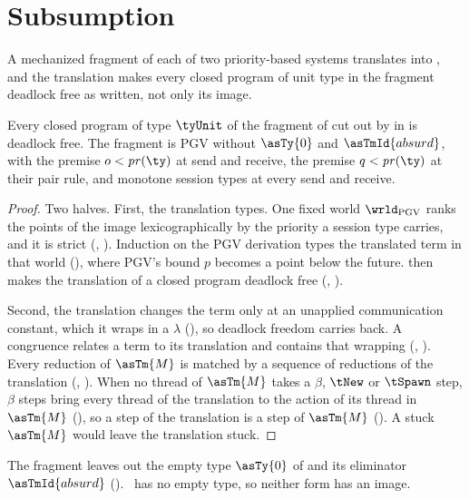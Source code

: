 \section{Subsumption}
\label{sec:ex-priority}

A mechanized fragment of each of two priority-based systems translates
into \OurLang, and the translation makes every closed program of unit
type in the fragment deadlock free as written, not only its image.

\begin{theorem}
\label{thm:pgv}
  Every closed program of type $\tyUnit$ of the fragment of
  \citet{KokkeD23} cut out by  in  is deadlock free. The
  fragment is PGV without $\asTy{0}$ and $\asTmId{absurd}$, with the
  premise $o < \mathit{pr}(\ty)$ at send and receive, the premise
  $q < \mathit{pr}(\ty)$ at their pair rule, and monotone session types
  at every send and receive.
\end{theorem}

\begin{proof}
  Two halves. First, the translation types. One fixed world $\wrld_{\mathrm{PGV}}$
  ranks the points of the image lexicographically by the priority a
  session type carries, and it is strict (,
  ). Induction on the PGV derivation types the
  translated term in that world (), where PGV's
  bound $p$ becomes a point below the future.  then makes the
  translation of a closed program deadlock free
  (, ).

  Second, the translation changes the term only at an unapplied
  communication constant, which it wraps in a $\lambda$
  (), so deadlock freedom carries back. A congruence
  relates a term to its translation and contains that wrapping
  (, ). Every reduction of $\asTm{M}$ is matched
  by a sequence of reductions of the translation
  (, ). When no thread of $\asTm{M}$ takes a $\beta$,
  $\tNew$ or $\tSpawn$ step, $\beta$ steps bring every thread of the
  translation to the action of its thread in $\asTm{M}$ (),
  so a step of the translation is a step of $\asTm{M}$
  (). A stuck $\asTm{M}$ would leave the translation stuck.
\end{proof}

The fragment leaves out the empty type $\asTy{0}$ of
\citet{KokkeD23} and its eliminator $\asTmId{absurd}$
(). \OurLang\ has no empty type, so neither form has an
image.

